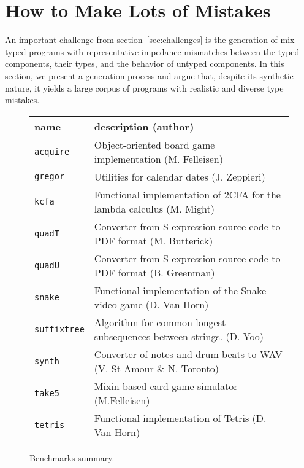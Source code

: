 \section{How to Make Lots of Mistakes} 

An important challenge from section~\ref{sec:challenges} is the generation of
mix-typed programs with representative impedance mismatches between
the typed components, their types, and the behavior of untyped components. In this section, we
present a generation process and argue that, despite its synthetic
nature, it yields a large corpus of programs with  realistic and diverse type mistakes.


\begin{figure*}
\begin{tabular}{p{2cm} | p{10cm} }
  {\bf  name} & {\bf description (author)}  \\

\hline

  \texttt{acquire} & Object-oriented board game implementation (M. Felleisen)  \\%


\hline
  \texttt{gregor} & Utilities for calendar dates (J. Zeppieri) \\%


\hline
  \texttt{kcfa} & Functional implementation of 2CFA for the lambda calculus (M. Might) \\%


\hline
  \texttt{quadT} & Converter from S-expression source code to PDF format (M. Butterick)\\%

\hline
  \texttt{quadU} & Converter from S-expression source code to PDF format  (B. Greenman) \\%

\hline
  \texttt{snake} & Functional implementation of the  Snake video game (D. Van Horn) \\%

\hline
  \texttt{suffixtree} & Algorithm for common longest subsequences between strings. (D. Yoo) \\%

\hline
  \texttt{synth} & Converter of notes and drum beats to WAV (V. St-Amour \& N. Toronto) \\%

\hline
  \texttt{take5} & Mixin-based card game simulator (M.Felleisen)  \\%

\hline
  \texttt{tetris} & Functional implementation of Tetris (D. Van Horn) \\%


\end{tabular}
  \caption{Benchmarks summary.}
  \label{table:benchmark-descriptions}
\end{figure*}


